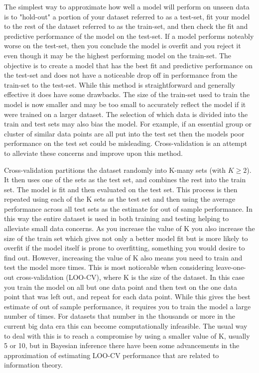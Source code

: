 The simplest way to approximate how well a model will perform on unseen data is to "hold-out" a portion of your dataset referred to as a test-set, fit your model to the rest of the dataset referred to as the train-set, and then check the fit and predictive performance of the model on the test-set. If a model performs noteably worse on the test-set, then you conclude the model is overfit and you reject it even though it may be the highest performing model on the train-set. The objective is to create a model that has the best fit and predictive performance on the test-set and does not have a noticeable drop off in performance from the train-set to the test-set. While this method is straightforward and generally effective it does have some drawbacks. The size of the train-set used to train the model is now smaller and may be too small to accurately reflect the model if it were trained on a larger dataset. The selection of which data is divided into the train and test sets may also bias the model. For example, if an essential group or cluster of similar data points are all put into the test set then the models poor performance on the test set could be misleading. Cross-validation is an attempt to alleviate these concerns and improve upon this method.

Cross-validation partitions the dataset randomly into K-many sets (with $K \geq 2$). It then uses one of the sets as the test set, and combines the rest into the train set. The model is fit and then evaluated on the test set. This process is then repeated using each of the K sets as the test set and then using the average performance across all test sets as the estimate for out of sample performance. In this way the entire dataset is used in both training and testing helping to alleviate small data concerns. As you increase the value of K you also increase the size of the train set which gives not only a better model fit but is more likely to overfit if the model itself is prone to overfitting, something you would desire to find out. However, increasing the value of K also means you need to train and test the model more times. This is most noticeable when considering leave-one-out cross-validation (LOO-CV), where K is the size of the dataset. In this case you train the model on all but one data point and then test on the one data point that was left out, and repeat for each data point. While this gives the best estimate of out of sample performance, it requires you to train the model a large number of times. For datasets that number in the thousands or more in the current big data era this can become computationally infeasible. The usual way to deal with this is to reach a compromise by using a smaller value of K, usually 5 or 10, but in Bayesian inference there have been some advancements in the approximation of estimating LOO-CV performance that are related to information theory.

